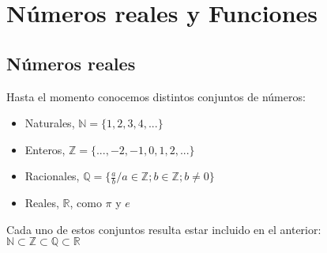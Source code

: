 \documentclass[Análisis.root.tex]{subfiles}
\begin{document}
    \section{Números reales y Funciones}
    \subsection{Números reales}
        Hasta el momento conocemos distintos conjuntos de números:
        \begin{itemize}
            \item Naturales, $\mathbb{N} = \{1,2,3,4,...\}$
            \item Enteros, $\mathbb{Z} = \{...,-2,-1,0,1,2,...\}$
            \item Racionales, $\mathbb{Q} = \{\frac{a}{b} / a \in \mathbb{Z}; b \in \mathbb{Z};b \ne 0\}$
            \item Reales, $\mathbb{R}$, como $\pi$ y $e$
        \end{itemize}
        Cada uno de estos conjuntos resulta estar incluido en el anterior:\\[2mm]
        $\mathbb{N} \subset \mathbb{Z} \subset \mathbb{Q} \subset \mathbb{R}$
        \begin{center}
        \end{center}
\end{document}
